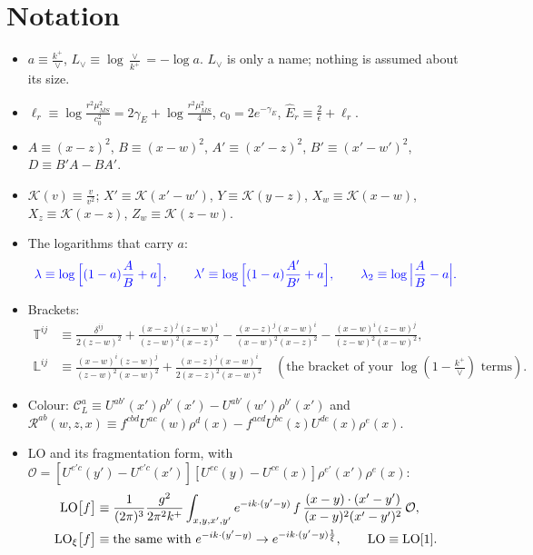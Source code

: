 \documentclass[10pt]{article}
\numberwithin{equation}{section}
\newcommand{\new}[1]{{\color{blue}#1}}
\newcommand{\Lv}{L_{\vee}}
\newcommand{\CL}{\mathcal C_L}
\newcommand{\Rc}{\mathcal R}
\newcommand{\OO}{\mathcal O}
\newcommand{\KK}{\mathcal K}
\newcommand{\Eh}{\hat E}
\newcommand{\LOx}[1]{{\rm LO}_\xi\big[#1\big]}
\newcommand{\pre}{\frac{1}{(2\pi)^3}}
\begin{document}
\section{Notation}\label{sec:notation}
\begin{itemize}
\item $a\equiv\frac{k^+}{\vee}$, $\Lv\equiv\log\frac{\vee}{k^+}=-\log a$. $\Lv$ is only a name; nothing is assumed about its size.
\item $\ell_r\equiv\log\frac{r^2\mu^2_{\overline{MS}}}{c_0^2}=2\gamma_E+\log\frac{r^2\mu^2_{\overline{MS}}}{4}$, $c_0=2e^{-\gamma_E}$, $\Eh_r\equiv\frac{2}{\epsilon}+\ell_r$.
\item $A\equiv(x-z)^2$, $B\equiv(x-w)^2$, $A'\equiv(x'-z)^2$, $B'\equiv(x'-w')^2$, $D\equiv B'A-BA'$.
\item $\KK(v)\equiv\frac{v}{v^2}$; $X'\equiv\KK(x'-w')$, $Y\equiv\KK(y-z)$, $X_w\equiv\KK(x-w)$, $X_z\equiv\KK(x-z)$, $Z_w\equiv\KK(z-w)$.
\item The logarithms that carry $a$:
\begin{equation*}
\new{\lambda\equiv\log\Big[(1-a)\frac{A}{B}+a\Big],\qquad\lambda'\equiv\log\Big[(1-a)\frac{A'}{B'}+a\Big],\qquad\lambda_2\equiv\log\Big|\frac{A}{B}-a\Big|.}
\end{equation*}
\item Brackets:
\begin{align*}
\mathbb T^{ij}&\equiv\frac{\delta^{ij}}{2(z-w)^2}+\frac{(x-z)^j(z-w)^i}{(z-w)^2(x-z)^2}-\frac{(x-z)^j(x-w)^i}{(x-w)^2(x-z)^2}-\frac{(x-w)^i(z-w)^j}{(z-w)^2(x-w)^2},\\
\mathbb L^{ij}&\equiv\frac{(x-w)^i(z-w)^j}{(z-w)^2(x-w)^2}+\frac{(x-z)^j(x-w)^i}{2(x-z)^2(x-w)^2}\quad(\text{the bracket of your }\log(1-\tfrac{k^+}{\vee})\text{ terms}).
\end{align*}
\item Colour: $\CL^a\equiv U^{ab'}(x')\rho^{b'}(x')-U^{ab'}(w')\rho^{b'}(x')$ and $\Rc^{ab}(w,z,x)\equiv f^{cbd}U^{ac}(w)\rho^d(x)-f^{acd}U^{bc}(z)U^{de}(x)\rho^e(x)$.
\item LO and its fragmentation form, with $\OO=[U^{e'c}(y')-U^{e'c}(x')][U^{ec}(y)-U^{ce}(x)]\rho^{e'}(x')\rho^e(x)$:
\begin{align*}
{\rm LO}\big[f\big]&\equiv\pre\frac{g^2}{2\pi^2k^+}\int_{x,y,x',y'}e^{-ik\cdot(y'-y)}\,f\,\frac{(x-y)\cdot(x'-y')}{(x-y)^2(x'-y')^2}\,\OO,\\
\LOx{f}&\equiv\text{the same with }e^{-ik\cdot(y'-y)}\to e^{-ik\cdot(y'-y)\frac1\xi},\qquad {\rm LO}\equiv{\rm LO}[1].
\end{align*}

\end{itemize}
\end{document}
